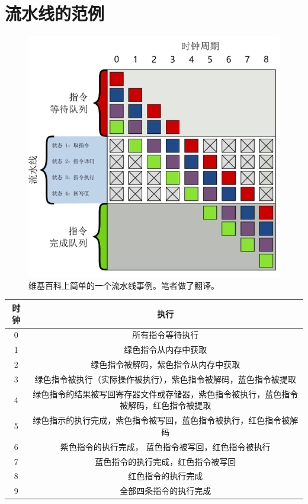 \documentclass[UTF8,18pt]{ctexart}
\begin{document}
\section{流水线的范例}
\begin{figure}[ht]
	\centering
	\includegraphics[scale=0.4]{pipe.pdf}
	\caption{ 
		维基百科上简单的一个流水线事例。笔者做了翻译。
	}
	\label{fig:pipeliing}
\end{figure}
\begin{table}[H]
\begin{tabular}{|c|c|}
\hline
时钟&执行 \\
\hline
0&所有指令等待执行 \\
\hline
1&绿色指令从内存中获取 \\
\hline
2&绿色指令被解码，紫色指令从内存中获取 \\
\hline
3&绿色指令被执行（实际操作被执行），紫色指令被解码，蓝色指令被提取 \\
\hline
4&绿色指令的结果被写回寄存器文件或存储器，紫色指令被执行，蓝色指令被解码，红色指令被提取 \\
\hline
5&绿色指示的执行完成，紫色指令被写回，蓝色指令被执行，红色指令被解码\\
\hline
6&紫色指令的执行完成， 蓝色指令被写回，红色指令被执行\\
\hline
7& 蓝色指令的执行完成，红色指令被写回\\
\hline
8& 红色指令的执行完成\\
\hline
9& 全部四条指令的执行完成\\
\hline
\end{tabular}
\end{table}
\end{document}
